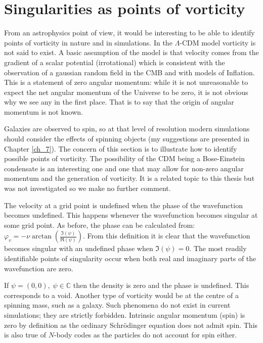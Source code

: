 \section{Singularities as points of vorticity}
\label{vort}
From an astrophysics point of view, it would be interesting to be able to identify points of vorticity in nature and in simulations. In the $\Lambda$-CDM model vorticity is not said to exist. A basic assumption of the model is that velocity comes from the gradient of a scalar potential (irrotational) which is consistent with the observation of a gaussian random field in the CMB and with models of Inflation. This is a statement of zero angular momentum: while it is not unreasonable to expect the net angular momentum of the Universe to be zero, it is not obvious why we see any in the first place. That is to say that the origin of angular momentum is not known.

Galaxies are observed to spin, so at that level of resolution modern simulations should consider the effects of spinning objects (my suggestions are presented in Chapter \ref{ch_7}). The concern of this section is to illustrate how to identify possible points of vorticity. The possibility of the CDM being a Bose-Einstein condensate is an interesting one and one that may allow for non-zero angular momentum and the generation of vorticity. It is a related topic to this thesis but was not investigated so we make no further comment.

The velocity at a grid point is undefined when the phase of the wavefunction becomes undefined. This happens whenever the wavefunction becomes singular at some grid point. As before, the phase can be calculated from: $\varphi_{v} = - \nu \arctan\left(\frac{\Im(\psi)}{\Re(\psi)}\right)$. From this definition it is clear that the wavefunction becomes singular with an undefined phase when $\mathfrak{I}(\psi) = 0$. The most readily identifiable points of singularity occur when both real and imaginary parts of the wavefunction are zero.

If $\psi = (0,0), \;\psi\in\mathbb{C}$ then the density is zero and the phase is undefined. This corresponds to a void. Another type of vorticity would be at the centre of a spinning mass, such as a galaxy. Such phenomena do not exist in current simulations; they are strictly forbidden. Intrinsic angular momentum (spin) is zero by definition as the ordinary Schr\"odinger equation does not admit spin. This is also true of $N$-body codes as the particles do not account for spin either. 

